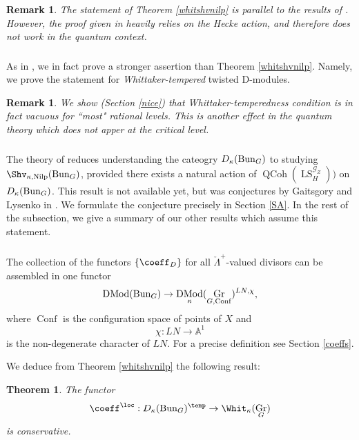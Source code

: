 \documentclass[9pt]{amsart}
\DeclareMathOperator{\Gra}{{Gr}}
\newcommand{\bA}{{\mathbb A}}
\newcommand{\cG}{{\mathcal G}}
\newtheorem{thm}[subsubsection]{Theorem}
\DeclareMathOperator{\QCoh}{{QCoh}}
\DeclareMathOperator{\LocSys}{{LS}}
\DeclareMathOperator{\Nilp}{{Nilp}} \DeclareMathOperator{\op}{{op}}
\newtheorem{rem}[subsubsection]{Remark}
\numberwithin{equation}{section}
\DeclareMathOperator{\D}{{DMod}}
\begin{document}
	\begin{rem}
		The statement of Theorem \ref{whitshvnilp} is parallel to the results of \cite{FR}. However, the proof given in \cite{FR} heavily relies on the Hecke action, and therefore does not work in the quantum context.
	\end{rem}

\subsubsection{} As in \cite{FR}, we in fact prove a stronger assertion than Theorem \ref{whitshvnilp}. Namely, we prove the statement for \emph{Whittaker-tempered} twisted D-modules. 

\begin{rem}
	We show (Section \ref{nice}) that Whittaker-temperedness condition is in fact vacuous for ``most"  rational levels. This is another effect in the quantum theory which does not apper at the critical level.
\end{rem}

\subsubsection{} The theory of \cite[Section 20]{AGKRRV} reduces understanding the cateogry  $D_{\kappa}(\operatorname{{Bun}}_G)$ to studying $\Shv_{\kappa, \Nilp}(\Bun_G)$, provided there exists a natural action of $\QCoh(\LocSys_H^{\cG_Z}))$ on $D_{\kappa}(\operatorname{{Bun}}_G)$. This result is not available yet, but was conjectures by Gaitsgory and Lysenko in \cite{GL}. We formulate the conjecture precisely in  Section \ref{SA}. In the rest of the subsection, we give a summary of our other results which assume this statement. 

\subsubsection{} The collection of the functors $\{\coeff_D \}$ for all $\check{\Lambda}^+$-valued divisors can be assembled in one functor  $$\D(\Bun_G) \rightarrow \D_{\kappa}(\Gra_{G, \operatorname{Conf}})^{LN, \chi},$$
where $\operatorname{Conf}$ is the configuration space of points of $X$ and $$\chi: LN \rightarrow \bA^1$$ is the non-degenerate character of $LN$. For a precise definition see Section \ref{coeffs}.

We deduce from Theorem \ref{whitshvnilp} the following result:
\begin{thm}\label{generalintro}
	The functor 
	$$\coeff^{\loc}: D_{\kappa}(\Bun_{G})^{\temp} \rightarrow \Whit_{\kappa}(\Gra_G)$$ is conservative.
\end{thm}
\end{document}
